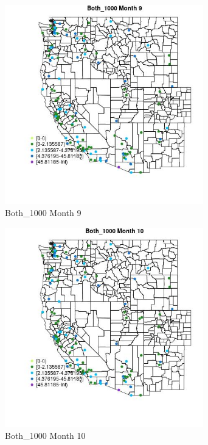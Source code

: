 \begin{figure} 
\centering  
\includegraphics[width=0.77\textwidth]{Code_Outputs/Report_ML_input_PM25_Step4_part_e_de_duplicated_aves_MapObsMo9Both_1000.jpg} 
\caption{\label{fig:Report_ML_input_PM25_Step4_part_e_de_duplicated_avesMapObsMo9Both_1000}Both_1000 Month 9} 
\end{figure} 
 

\begin{figure} 
\centering  
\includegraphics[width=0.77\textwidth]{Code_Outputs/Report_ML_input_PM25_Step4_part_e_de_duplicated_aves_MapObsMo10Both_1000.jpg} 
\caption{\label{fig:Report_ML_input_PM25_Step4_part_e_de_duplicated_avesMapObsMo10Both_1000}Both_1000 Month 10} 
\end{figure} 
 

